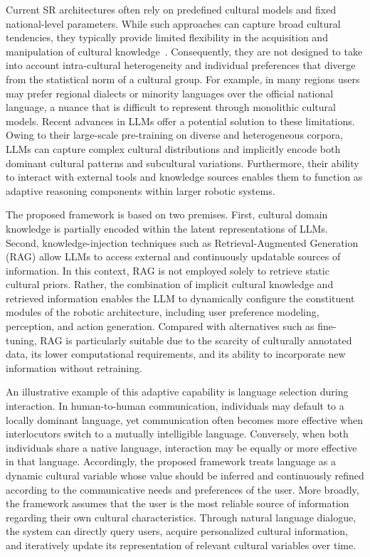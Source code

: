 Current SR architectures often rely on predefined cultural models and fixed national-level parameters. 
While such approaches can capture broad cultural tendencies, they typically provide limited flexibility in the acquisition and manipulation of cultural knowledge~\citep{akinade2023culturally}. 
Consequently, they are not designed to take into account intra-cultural heterogeneity and individual preferences that diverge from the statistical norm of a cultural group. 
For example, in many regions users may prefer regional dialects or minority languages over the official national language, a nuance that is difficult to represent through monolithic cultural models. 
Recent advances in LLMs offer a potential solution to these limitations. 
Owing to their large-scale pre-training on diverse and heterogeneous corpora, LLMs can capture complex cultural distributions and implicitly encode both dominant cultural patterns and subcultural variations. 
Furthermore, their ability to interact with external tools and knowledge sources enables them to function as adaptive reasoning components within larger robotic systems.

The proposed framework is based on two premises. 
First, cultural domain knowledge is partially encoded within the latent representations of LLMs. 
Second, knowledge-injection techniques such as Retrieval-Augmented Generation (RAG)\cite{lewis2020retrieval} allow LLMs to access external and continuously updatable sources of information. 
In this context, RAG is not employed solely to retrieve static cultural priors. 
Rather, the combination of implicit cultural knowledge and retrieved information enables the LLM to dynamically configure the constituent modules of the robotic architecture, including user preference modeling, perception, and action generation. 
Compared with alternatives such as fine-tuning, RAG is particularly suitable due to the scarcity of culturally annotated data, its lower computational requirements, and its ability to incorporate new information without retraining.

An illustrative example of this adaptive capability is language selection during interaction. 
In human-to-human communication, individuals may default to a locally dominant language, yet communication often becomes more effective when interlocutors switch to a mutually intelligible language. 
Conversely, when both individuals share a native language, interaction may be equally or more effective in that language. 
Accordingly, the proposed framework treats language as a dynamic cultural variable whose value should be inferred and continuously refined according to the communicative needs and preferences of the user. 
More broadly, the framework assumes that the user is the most reliable source of information regarding their own cultural characteristics. 
Through natural language dialogue, the system can directly query users, acquire personalized cultural information, and iteratively update its representation of relevant cultural variables over time.

